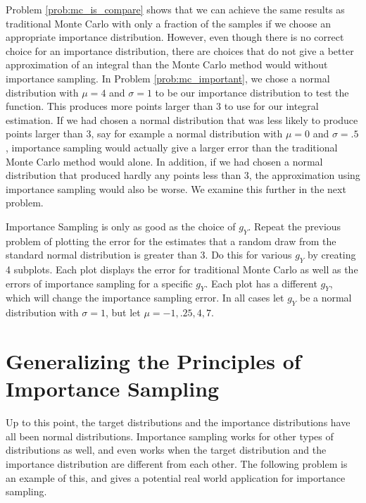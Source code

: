 Problem \ref{prob:mc_is_compare} shows that we can achieve the same results as traditional Monte Carlo with only a fraction of the samples if we choose an appropriate importance distribution.
However, even though there is no correct choice for an importance distribution, there are choices that do not give a better approximation of an integral than the Monte Carlo method would without importance sampling.
In Problem \ref{prob:mc_important}, we chose a normal distribution with $\mu = 4$ and $\sigma = 1$ to be our importance distribution to test the function.
This produces more points larger than $3$ to use for our integral estimation.
If we had chosen a normal distribution that was less likely to produce points larger than $3$, say for example a normal distribution with $\mu = 0$ and $\sigma = .5$, importance sampling would actually give a larger error than the traditional Monte Carlo method would alone.
In addition, if we had chosen a normal distribution that produced hardly any points less than $3$, the approximation using importance sampling would also be worse.
We examine this further in the next problem.

\begin{problem} \label{prob:other_plots}
Importance Sampling is only as good as the choice of $g_Y$.
Repeat the previous problem of plotting the error for the estimates that a random draw from the standard normal distribution is greater than 3.
Do this for various $g_Y$ by creating 4 subplots.
Each plot displays the error for traditional Monte Carlo as well as the errors of importance sampling for a specific $g_Y$.
Each plot has a different $g_Y$, which will change the importance sampling error.
In all cases let $g_Y$ be a normal distribution with $\sigma =1$, but let $\mu = -1, .25, 4, 7$.
\end{problem}

\section*{Generalizing the Principles of Importance Sampling} %

Up to this point, the target distributions and the importance distributions have all been normal distributions.
Importance sampling works for other types of distributions as well, and even works when the target distribution and the importance distribution are different from each other.
The following problem is an example of this, and gives a potential real world application for importance sampling.


